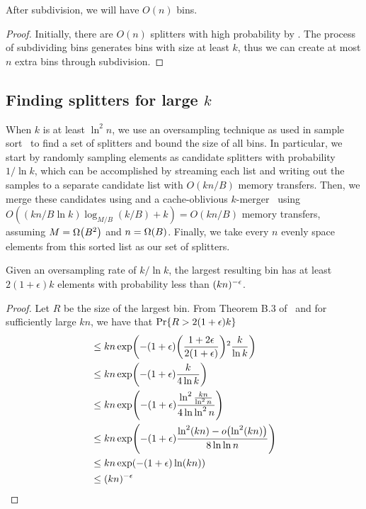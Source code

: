 \begin{lemma}
After subdivision, we will have $O(n)$ bins.
\end{lemma}
\begin{proof}
Initially, there are $O(n)$ splitters with high probability by .
The process of subdividing bins generates bins with size at least $k$, thus we
can create at most $n$ extra bins through subdivision.
\end{proof}

\subsection*{Finding splitters for large $k$}

When $k$ is at least $\ln ^2 n$, we use an oversampling technique as used in 
sample sort~\cite{BlellochLeMa91} to find a set of splitters and bound the 
size of all bins.  In particular, we start by randomly sampling elements as 
candidate splitters with probability $1/\ln k$, which can be accomplished by streaming
each list and writing out the samples to a separate candidate list with 
$O(kn/B)$ memory transfers.  Then, we merge these candidates using and a 
cache-oblivious $k$-merger~\cite{FrigoLePr99} using 
$O((kn/B\ln k) \log_{M/B} (k/B) + k) = O(kn/B)$ memory transfers, assuming 
$M=\Omega \mathopen{}\left(B^2\right)\mathclose{}$ and $n=\Omega \mathopen{}\left(B\right)\mathclose{}$.  Finally, we take every 
$n$ evenly space elements from this sorted list as our set of splitters.

\begin{theorem}
  Given an oversampling rate of $k/\ln k$, the largest resulting bin has at least 
  $2(1+\epsilon)k$ elements with probability less than $\mathopen{}\left(kn\right)\mathclose{}^{-\epsilon}$.
\end{theorem}
\begin{proof}
  Let $R$ be the size of the largest bin.  From Theorem B.3 of~\cite{BlellochLeMa91} 
  and for sufficiently large $kn$, we have that $\Pr\mathopen{}\left\{ R > 2(1+\epsilon)k \right\}\mathclose{}$
  \begin{align*}
    &\leq kn \exp \mathopen{}\left( -(1+\epsilon)\mathopen{}\left(\frac{1+2\epsilon}{2(1+\epsilon)}\right)\mathclose{}^2 \frac{k}{\ln k} \right)\mathclose{}\\
    &\leq kn \exp \mathopen{}\left(-(1+\epsilon)\frac{k}{4\ln k}\right)\mathclose{}\\
    &\leq {kn} \exp \mathopen{}\left(-(1+\epsilon)\frac{\ln^2 \frac{kn}{\ln^2 n}}{4 \ln \ln ^2 n}\right)\mathclose{}\\
    &\leq {kn} \exp \mathopen{}\left(-(1+\epsilon)\frac{\ln^2 \mathopen{}\left(kn\right)\mathclose{} - o\mathopen{}\left(\ln^2 \mathopen{}\left(kn\right)\mathclose{}\right)\mathclose{} }{8 \ln \ln n}\right)\mathclose{}\\
    &\leq {kn} \exp \mathopen{}\left(-(1+\epsilon)\ln \mathopen{}\left(kn\right)\mathclose{}\right)\mathclose{}\\
    &\leq \mathopen{}\left(kn\right)\mathclose{}^{-\epsilon}\\
  \end{align*}
\end{proof}



